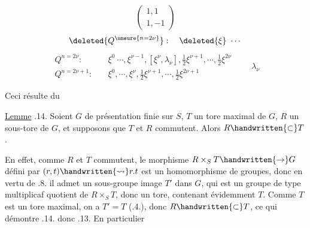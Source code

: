 \[
\begin{pmatrix}1,1\\1,-1\end{pmatrix}
\]
\[
\deleted{Q^{\unsure{n=2\nu}}}:\quad \deleted{\xi}\ \cdots
\]
\[
\boxed{\begin{aligned}
Q^{n=2\nu}:\quad &\xi^0\ \cdots,\xi^{\nu-1},[\xi^\nu,\lambda_\nu],\tfrac12\xi^{\nu+1},\cdots,\tfrac12\xi^{2\nu}\\
Q^{n=2\nu+1}:\quad &\xi^0,\cdots,\xi^\nu,\tfrac12\xi^{\nu+1},\cdots,\tfrac12\xi^{2\nu+1}
\end{aligned}}\qquad \lambda_\nu
\]

Ceci résulte du 

\uline{Lemme} .14. Soient $G$  de présentation finie sur $S$, $T$ un tore maximal de $G$,  $R$ un sous-tore de $G$, et supposons que $T$ et $R$ commutent. Alors $R\handwritten{\subset} T$.

En effet, comme $R$ et $T$ commutent, le morphisme $R\times_S T\handwritten{\to}G$ défini  par $(r,t)\handwritten{\rightsquigarrow}r.t$ est un homomorphisme de groupes, donc en vertu de .8. il admet un sous-groupe image $T'$ dans $G$, qui est un groupe de type multiplicaf quotient de $R\times_S T$, donc un tore, contenant évidemment $T$. Comme $T$ est un tore maximal, on a $T'=T$ (.4.), donc $R\handwritten{\subset}T$,  ce qui démontre .14. donc .13. En particulier

